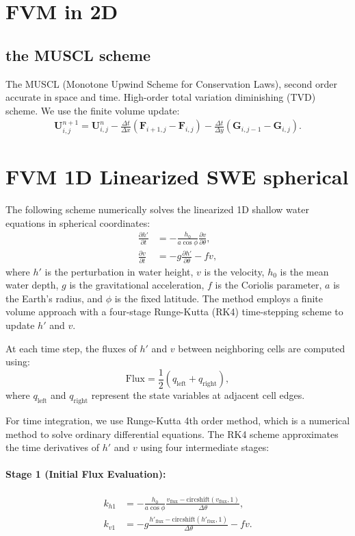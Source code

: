 \section{FVM in 2D}

\subsection{the MUSCL scheme}
The MUSCL (Monotone Upwind Scheme for Conservation Laws), second order accurate in space and time.
High-order total variation diminishing (TVD) scheme.
We use the finite volume update:
\begin{align}
    \mathbf{U}_{i,j}^{n+1} = \mathbf{U}_{i,j}^n - \frac{\Delta t}{\Delta x}(\mathbf{F}_{i+1,j} - \mathbf{F}_{i,j}) - \frac{\Delta t}{\Delta y}(\mathbf{G}_{i,j-1} - \mathbf{G}_{i,j}).
\end{align}


\section{FVM 1D Linearized SWE spherical}

The following scheme numerically solves the linearized 1D shallow water equations in spherical coordinates:
\begin{align}
    \frac{\partial h'}{\partial t} &= -\frac{h_0}{a \cos\phi} \frac{\partial v}{\partial \theta}, \\
    \frac{\partial v}{\partial t} &= -g \frac{\partial h'}{\partial \theta} - f v,
\end{align}
where \(h'\) is the perturbation in water height, \(v\) is the velocity, \(h_0\) is the mean water depth, \(g\) is the gravitational acceleration, \(f\) is the Coriolis parameter, \(a\) is the Earth's radius, and \(\phi\) is the fixed latitude. 
The method employs a finite volume approach with a four-stage Runge-Kutta (RK4) time-stepping scheme to update \(h'\) and \(v\).

At each time step, the fluxes of \(h'\) and \(v\) between neighboring cells are computed using:
\[
\text{Flux} = \frac{1}{2}(q_\text{left} + q_\text{right}),
\]
where \(q_\text{left}\) and \(q_\text{right}\) represent the state variables at adjacent cell edges.

For time integration, we use Runge-Kutta 4th order method, which is a numerical method to solve ordinary differential equations.
The RK4 scheme approximates the time derivatives of \(h'\) and \(v\) using four intermediate stages:
\paragraph{Stage 1 (Initial Flux Evaluation):}
\begin{align}
    k_{h1} &= -\frac{h_0}{a \cos\phi} \frac{v_\text{flux} - \text{circshift}(v_\text{flux}, 1)}{\Delta \theta}, \\
    k_{v1} &= -g \frac{h'_\text{flux} - \text{circshift}(h'_\text{flux}, 1)}{\Delta \theta} - f v.
\end{align}

